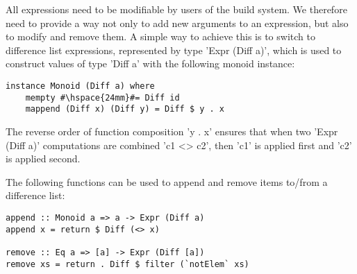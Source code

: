 All expressions need to be modifiable by users of the build system. We therefore
need to provide a way not only to add new arguments to an expression, but also
to modify and remove them. A simple way to achieve this is to switch to difference
list expressions, represented by type \lst'Expr (Diff a)', which is used to
construct values of type \lst'Diff a' with the following monoid instance:

\begin{lstlisting}
instance Monoid (Diff a) where
    mempty #\hspace{24mm}#= Diff id
    mappend (Diff x) (Diff y) = Diff $ y . x
\end{lstlisting}

\noindent The reverse order of function composition \lst'y . x' ensures that
when two \lst'Expr (Diff a)' computations are combined \lst'c1 <> c2', then
\lst'c1' is applied first and \lst'c2' is applied second.

The following functions can be used to append and remove items to/from a
difference list:

\begin{lstlisting}
append :: Monoid a => a -> Expr (Diff a)
append x = return $ Diff (<> x)

remove :: Eq a => [a] -> Expr (Diff [a])
remove xs = return . Diff $ filter (`notElem` xs)
\end{lstlisting}

\newcommand{\tabx}[1]{\hspace{.106\textwidth}\rlap{#1}}
\newcommand{\taby}[1]{\hspace{.114\textwidth}\rlap{#1}}
\newcommand{\tabz}[1]{\hspace{.24\textwidth}\rlap{#1}}

